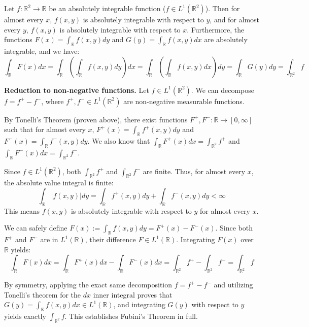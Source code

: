 \begin{theorem}[Fubini]
    Let $f: \mathbb{R}^2 \rightarrow \mathbb{R}$ be an absolutely integrable function ($f \in L^1(\mathbb{R}^2)$). Then for almost every $x$, $f(x,y)$ is absolutely integrable with respect to $y$, and for almost every $y$, $f(x,y)$ is absolutely integrable with respect to $x$. Furthermore, the functions $F(x) = \int_\mathbb{R} f(x,y) dy$ and $G(y) = \int_\mathbb{R} f(x,y) dx$ are absolutely integrable, and we have:
    $$ \int_\mathbb{R} F(x) dx = \int_\mathbb{R} \left( \int_\mathbb{R} f(x,y) dy \right) dx = \int_\mathbb{R} \left( \int_\mathbb{R} f(x,y) dx \right) dy = \int_\mathbb{R} G(y) dy = \int_{\mathbb{R}^2} f $$
\end{theorem}

\begin{pfbox}
    \textbf{Reduction to non-negative functions.}
    Let $f \in L^1(\mathbb{R}^2)$. We can decompose $f = f^+ - f^-$, where $f^+, f^- \in L^1(\mathbb{R}^2)$ are non-negative measurable functions.
    
    By Tonelli's Theorem (proven above), there exist functions $F^+, F^-: \mathbb{R} \rightarrow [0, \infty]$ such that for almost every $x$, $F^+(x) = \int_\mathbb{R} f^+(x,y)dy$ and $F^-(x) = \int_\mathbb{R} f^-(x,y)dy$. We also know that $\int_\mathbb{R} F^+(x)dx = \int_{\mathbb{R}^2} f^+$ and $\int_\mathbb{R} F^-(x)dx = \int_{\mathbb{R}^2} f^-$.
    
    Since $f \in L^1(\mathbb{R}^2)$, both $\int_{\mathbb{R}^2} f^+$ and $\int_{\mathbb{R}^2} f^-$ are finite. Thus, for almost every $x$, the absolute value integral is finite: 
    $$ \int_\mathbb{R} |f(x,y)|dy = \int_\mathbb{R} f^+(x,y)dy + \int_\mathbb{R} f^-(x,y)dy < \infty $$
    This means $f(x,y)$ is absolutely integrable with respect to $y$ for almost every $x$.
    
    We can safely define $F(x) := \int_\mathbb{R} f(x,y)dy = F^+(x) - F^-(x)$. Since both $F^+$ and $F^-$ are in $L^1(\mathbb{R})$, their difference $F \in L^1(\mathbb{R})$. 
    Integrating $F(x)$ over $\mathbb{R}$ yields:
    $$ \int_\mathbb{R} F(x)dx = \int_\mathbb{R} F^+(x)dx - \int_\mathbb{R} F^-(x)dx = \int_{\mathbb{R}^2} f^+ - \int_{\mathbb{R}^2} f^- = \int_{\mathbb{R}^2} f $$
    
    By symmetry, applying the exact same decomposition $f = f^+ - f^-$ and utilizing Tonelli's theorem for the $dx$ inner integral proves that $G(y) = \int_\mathbb{R} f(x,y)dx \in L^1(\mathbb{R})$, and integrating $G(y)$ with respect to $y$ yields exactly $\int_{\mathbb{R}^2} f$. This establishes Fubini's Theorem in full.
\end{pfbox}
